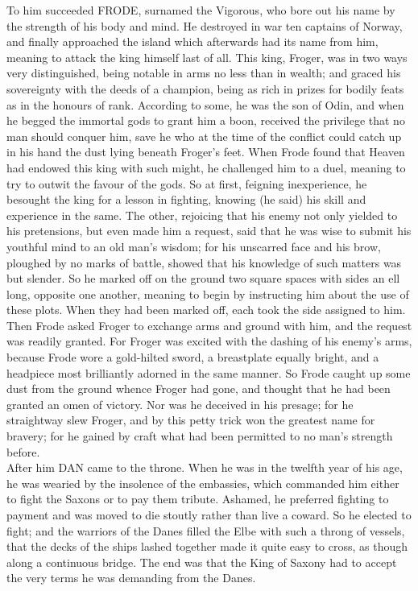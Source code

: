 \documentclass[10pt,a4paper]{report}
\begin{document}
To him succeeded FRODE, surnamed the Vigorous, who bore out his name by the strength of his body and mind. He destroyed in war ten captains of Norway, and finally approached the island which afterwards had its name from him, meaning to attack the king himself last of all. This king, Froger, was in two ways very distinguished, being notable in arms no less than in wealth; and graced his sovereignty with the deeds of a champion, being as rich in prizes for bodily feats as in the honours of rank. According to some, he was the son of Odin, and when he begged the immortal gods to grant him a boon, received the privilege that no man should conquer him, save he who at the time of the conflict could catch up in his hand the dust lying beneath Froger's feet. When Frode found that Heaven had endowed this king with such might, he challenged him to a duel, meaning to try to outwit the favour of the gods. So at first, feigning inexperience, he besought the king for a lesson in fighting, knowing (he said) his skill and experience in the same. The other, rejoicing that his enemy not only yielded to his pretensions, but even made him a request, said that he was wise to submit his youthful mind to an old man's wisdom; for his unscarred face and his brow, ploughed by no marks of battle, showed that his knowledge of such matters was but slender. So he marked off on the ground two square spaces with sides an ell long, opposite one another, meaning to begin by instructing him about the use of these plots. When they had been marked off, each took the side assigned to him. Then Frode asked Froger to exchange arms and ground with him, and the request was readily granted. For Froger was excited with the dashing of his enemy's arms, because Frode wore a gold-hilted sword, a breastplate equally bright, and a headpiece most brilliantly adorned in the same manner. So Frode caught up some dust from the ground whence Froger had gone, and thought that he had been granted an omen of victory. Nor was he deceived in his presage; for he straightway slew Froger, and by this petty trick won the greatest name for bravery; for he gained by craft what had been permitted to no man's strength before.\\

After him DAN came to the throne. When he was in the twelfth year of his age, he was wearied by the insolence of the embassies, which commanded him either to fight the Saxons or to pay them tribute. Ashamed, he preferred fighting to payment and was moved to die stoutly rather than live a coward. So he elected to fight; and the warriors of the Danes filled the Elbe with such a throng of vessels, that the decks of the ships lashed together made it quite easy to cross, as though along a continuous bridge. The end was that the King of Saxony had to accept the very terms he was demanding from the Danes.\\
\end{document}
